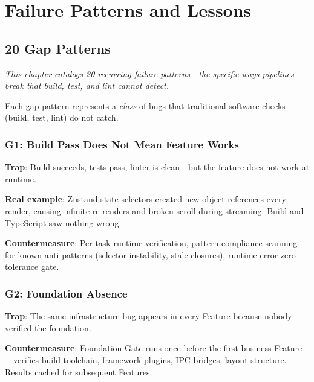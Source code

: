 \documentclass[11pt,a4paper,openright,twoside]{report}
\begin{document}
\part{Failure Patterns and Lessons}

\chapter{20 Gap Patterns}
\label{ch:gaps}

\textit{This chapter catalogs 20 recurring failure patterns---the specific ways pipelines break that build, test, and lint cannot detect.}

Each gap pattern represents a \emph{class} of bugs that traditional software checks (build, test, lint) do not catch.

\section{G1: Build Pass Does Not Mean Feature Works}

\textbf{Trap}: Build succeeds, tests pass, linter is clean---but the feature does not work at runtime.

\textbf{Real example}: Zustand state selectors created new object references every render, causing infinite re-renders and broken scroll during streaming. Build and TypeScript saw nothing wrong.

\textbf{Countermeasure}: Per-task runtime verification, pattern compliance scanning for known anti-patterns (selector instability, stale closures), runtime error zero-tolerance gate.

\section{G2: Foundation Absence}

\textbf{Trap}: The same infrastructure bug appears in every Feature because nobody verified the foundation.

\textbf{Countermeasure}: Foundation Gate runs once before the first business Feature---verifies build toolchain, framework plugins, IPC bridges, layout structure. Results cached for subsequent Features.
\end{document}
